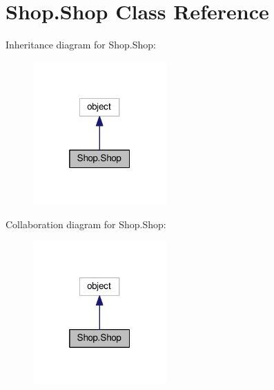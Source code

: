 \hypertarget{class_shop_1_1_shop}{}\section{Shop.\+Shop Class Reference}
\label{class_shop_1_1_shop}


Inheritance diagram for Shop.\+Shop\+:\nopagebreak
\begin{figure}[H]
\begin{center}
\leavevmode
\includegraphics[width=145pt]{class_shop_1_1_shop__inherit__graph}
\end{center}
\end{figure}


Collaboration diagram for Shop.\+Shop\+:\nopagebreak
\begin{figure}[H]
\begin{center}
\leavevmode
\includegraphics[width=145pt]{class_shop_1_1_shop__coll__graph}
\end{center}
\end{figure}

